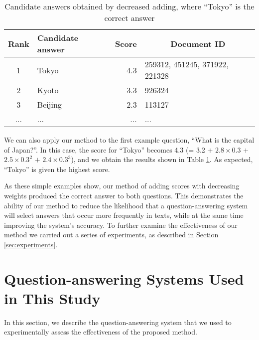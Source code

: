 \begin{table}[t]
  \begin{center}
    \caption{Candidate answers obtained by decreased adding, where ``Tokyo'' is the correct answer}
    \begin{tabular}{|c|l|r|l|} \hline
Rank & Candidate answer & Score & \multicolumn{1}{c|}{Document ID}\\\hline
1 & Tokyo & 4.3 & 259312, 451245, 371922, 221328\\
2 & Kyoto & 3.3 & 926324\\
3 & Beijing & 2.3 &113127\\
... & ... & ...& ...\\\hline
\end{tabular}
\label{tab:plural_candidates6}
\end{center}
\end{table}

We can also apply our method to
the first example question, ``What is the capital of Japan?''. 
In this case, 
the score for ``Tokyo'' becomes 4.3 (= 3.2 $+$ $2.8 \times 0.3$ $+$ $2.5 \times 0.3^2$ $+$ $2.4 \times 0.3^3$), 
and we obtain the results shown in Table \ref{tab:plural_candidates6}. 
As expected, ``Tokyo'' is given the highest score. 

As these simple examples show, 
our method of adding scores with decreasing weights 
produced the correct answer to both questions. 
This demonstrates the ability of our method
to reduce the likelihood
that a question-answering system will select answers that occur more frequently in texts, 
while at the same time improving the system's accuracy. 
To further examine the effectiveness of our method 
we carried out a series of experiments, as described in Section \ref{sec:experiments}. 

\section{Question-answering Systems Used in This Study}
\label{sec:qas}

In this section, we describe the question-answering system 
that we used
to experimentally assess the effectiveness of the proposed method. 


